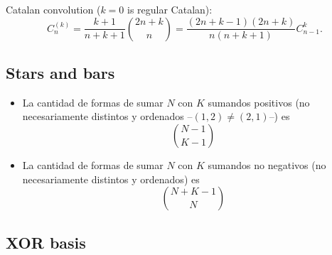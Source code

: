 Catalan convolution ($k = 0$ is regular Catalan):
	\[C_n^{(k)} = \frac{k+1}{n+k+1}\binom{2n+k}{n} = \frac{(2n + k - 1)(2n + k)}{n(n+k+1)} C_{n-1}^k.\]		

    \subsection{Stars and bars}

    \begin{itemize}
        \item La cantidad de formas de sumar $N$ con $K$ sumandos positivos (no necesariamente distintos y ordenados --$(1, 2) \neq (2, 1)$--) es \[ \binom{N-1}{K-1} \]	
        \item La cantidad de formas de sumar $N$ con $K$ sumandos no negativos (no necesariamente distintos y ordenados) es \[ \binom{N+K-1}{N} \]	
    \end{itemize}

\subsection{XOR basis}
